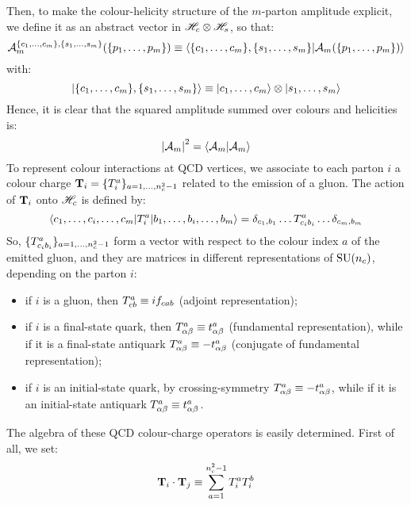 Then, to make the colour-helicity structure of the $ m $-parton amplitude explicit, we define it as an abstract vector in $ \mathscr{H}_c \otimes \mathscr{H}_s $, so that:
\begin{equation}
  \mathcal{A}_m^{\{c_1, \dots, c_m\}, \{s_1, \dots, s_m\}}(\{p_1, \dots, p_m\}) \equiv \braket{\{c_1, \dots, c_m\}, \{s_1, \dots, s_m\} | \mathcal{A}_m(\{p_1, \dots, p_m\})}
\end{equation}
with:
\begin{equation*}
  \ket{\{c_1, \dots, c_m\}, \{s_1, \dots, s_m\}} \equiv \ket{c_1, \dots, c_m} \otimes \ket{s_1, \dots, s_m}
\end{equation*}
Hence, it is clear that the squared amplitude summed over colours and helicities is:
\begin{equation}
  \left\lvert\mathcal{A}_m\right\rvert^2 = \braket{\mathcal{A}_m | \mathcal{A}_m}
\end{equation}
To represent colour interactions at QCD vertices, we associate to each parton $ i $ a colour charge $ \mathbf{T}_i = \{T_i^a\}_{a = 1, \dots, n_c^2 - 1} $ related to the emission of a gluon. The action of $ \mathbf{T}_i $ onto $ \mathscr{H}_c $ is defined by:
\begin{equation}
  \braket{c_1, \dots, c_i, \dots, c_m | T_i^a | b_1, \dots, b_i, \dots, b_m} = \delta_{c_1, b_1} \dots T^a_{c_i b_i} \dots \delta_{c_m, b_m}
  \label{eq:t-act}
\end{equation}
So, $ \{T^a_{c_i b_i}\}_{a = 1, \dots, n_c^2 - 1} $ form a vector with respect to the colour index $ a $ of the emitted gluon, and they are matrices in different representations of $ \mathrm{SU}(n_c) $, depending on the parton $ i $:
\begin{itemize}
  \item if $ i $ is a gluon, then $ T^a_{cb} \equiv i f_{cab} $ (adjoint representation);
  \item if $ i $ is a final-state quark, then $ T^a_{\alpha \beta} \equiv t^a_{\alpha \beta} $ (fundamental representation), while if it is a final-state antiquark $ T^a_{\alpha \beta} \equiv - t^a_{\alpha \beta} $ (conjugate of fundamental representation);
  \item if $ i $ is an initial-state quark, by crossing-symmetry $ T^a_{\alpha \beta} \equiv - t^a_{\alpha \beta}$, while if it is an initial-state antiquark $ T^a_{\alpha \beta} \equiv t^a_{\alpha \beta} $.
\end{itemize}
The algebra of these QCD colour-charge operators is easily determined. First of all, we set:
\begin{equation}
  \mathbf{T}_i \cdot \mathbf{T}_j \equiv \sum_{a = 1}^{n_c^2 - 1} T_i^a T_i^b
  \label{eq:t-dot}
\end{equation}
